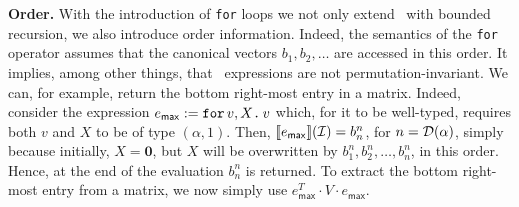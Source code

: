 \noindent\textbf{Order.} With the introduction of \texttt{for} loops we not only extend \lang\ with bounded recursion, we also introduce order information. Indeed, the semantics of the \texttt{for} operator assumes that the canonical vectors $b_1,b_2,\ldots$
are accessed in this order. It implies, among other things, that \langfor\ expressions are not permutation-invariant.
We can, for example, return the bottom right-most entry in a matrix. Indeed, consider the expression $e_{\mathsf{max}} := \texttt{for}\, v,X \texttt{.}\, v$ which, for it to be well-typed, requires both $v$ and $X$ to be of type $(\alpha,1)$. Then, $\llbracket e_{\mathsf{max}} \rrbracket(\mathcal{I})=b_n^n$, for $n=\mathcal{D}(\alpha)$, simply because initially, $X=\mathbf{0}$, but $X$ will be overwritten by $b_1^n,b_2^n,\ldots,b_n^n$, in this order. Hence, at the end of the evaluation $b_n^n$ is returned.
To extract the bottom right-most entry from a matrix, we now simply use $e_{\mathsf{max}}^T\cdot V\cdot e_{\mathsf{max}}$.


%

